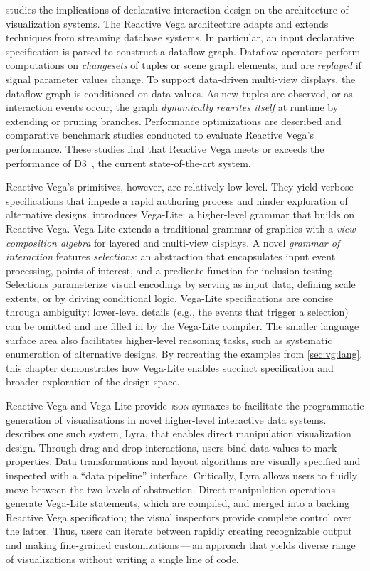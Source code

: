  studies the implications of declarative interaction design on
the architecture of visualization systems. The Reactive Vega architecture adapts
and extends techniques from streaming database systems. In particular, an input
declarative specification is parsed to construct a dataflow graph. Dataflow
operators perform computations on \emph{changesets} of tuples or scene graph
elements, and are \emph{replayed} if signal parameter values change. To support
data-driven multi-view displays, the dataflow graph is conditioned on data
values. As new tuples are observed, or as interaction events occur, the graph
\emph{dynamically rewrites itself} at runtime by extending or pruning branches.
Performance optimizations are described and comparative benchmark studies
conducted to evaluate Reactive Vega's performance. These studies find that
Reactive Vega meets or exceeds the performance of D3~\cite{bostock:d3}, the
current state-of-the-art system.

Reactive Vega's primitives, however, are relatively low-level. They yield
verbose specifications that impede a rapid authoring process and hinder
exploration of alternative designs.  introduces Vega-Lite: a
higher-level grammar that builds on Reactive Vega. Vega-Lite extends a
traditional grammar of graphics with a \emph{view composition algebra} for
layered and multi-view displays. A novel \emph{grammar of interaction} features
\emph{selections}: an abstraction that encapsulates input event processing,
points of interest, and a predicate function for inclusion testing. Selections
parameterize visual encodings by serving as input data, defining scale extents,
or by driving conditional logic. Vega-Lite specifications are concise through
ambiguity: lower-level details (e.g., the events that trigger a selection) can
be omitted and are filled in by the Vega-Lite compiler. The smaller language
surface area also facilitates higher-level reasoning tasks, such as systematic
enumeration of alternative designs. By recreating the examples from
\cref{sec:vg:lang}, this chapter demonstrates how Vega-Lite enables succinct
specification and broader exploration of the design space.

Reactive Vega and Vega-Lite provide \textsc{json} syntaxes to facilitate the
programmatic generation of visualizations in novel higher-level interactive data
systems.  describes one such system, Lyra, that enables direct
manipulation visualization design. Through drag-and-drop interactions, users
bind data values to mark properties. Data transformations and layout algorithms
are visually specified and inspected with a ``data pipeline'' interface.
Critically, Lyra allows users to fluidly move between the two levels of
abstraction. Direct manipulation operations generate Vega-Lite statements, which
are compiled, and merged into a backing Reactive Vega specification; the visual
inspectors provide complete control over the latter. Thus, users can iterate
between rapidly creating recognizable output and making fine-grained
customizations\,---\,an approach that yields diverse range of visualizations
without writing a single line of code.

